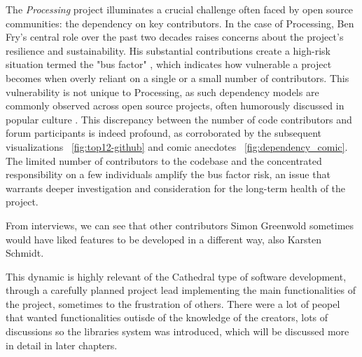 

The \textit{Processing} project illuminates a crucial challenge often faced by open source communities: the dependency on key contributors. In the case of Processing, Ben Fry's central role over the past two decades raises concerns about the project's resilience and sustainability. His substantial contributions create a high-risk situation termed the "bus factor" \parencite{BusFactor2023}, which indicates how vulnerable a project becomes when overly reliant on a single or a small number of contributors. This vulnerability is not unique to Processing, as such dependency models are commonly observed across open source projects, often humorously discussed in popular culture \parencite{munroeDependency2020}.
This discrepancy between the number of code contributors and forum participants is indeed profound, as corroborated by the subsequent visualizations ~\ref{fig:top12-github} and comic anecdotes ~\ref{fig:dependency_comic}. The limited number of contributors to the codebase and the concentrated responsibility on a few individuals amplify the bus factor risk, an issue that warrants deeper investigation and consideration for the long-term health of the project.


From interviews, we can see that other contributors Simon Greenwold sometimes would have liked features to be developed in a different way, also Karsten Schmidt.  

This dynamic is highly relevant of the Cathedral type of software development, through a carefully planned project lead implementing the main functionalities of the project, sometimes to the frustration of others. There were a lot of peopel that wanted functionalities outisde of the knowledge of the creators, lots of discussions so the libraries system was introduced, which will be discussed more in detail in later chapters.

